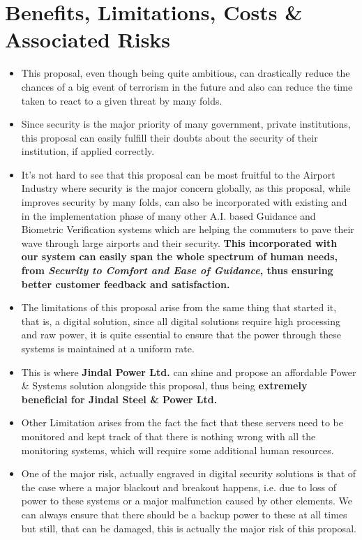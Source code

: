 \documentclass[a4paper,11pt]{article}
\begin{document}
\section{Benefits, Limitations, Costs \& Associated Risks}
\begin{itemize}
\item{This proposal, even though being quite ambitious, can drastically reduce the chances of a big event of terrorism in the future and also can reduce the time taken to react to a given threat by many folds.}
\item{Since security is the major priority of many government, private institutions, this proposal can easily fulfill their doubts about the security of their institution, if applied correctly.}
\item{It's not hard to see that this proposal can be most fruitful to the Airport Industry where security is the major concern globally, as this proposal, while improves security by many folds, can also be incorporated with existing and in the implementation phase of many other A.I. based Guidance and Biometric Verification systems which are helping the commuters to pave their wave through large airports and their security. \textbf{This incorporated with our system can easily span the whole spectrum of human needs, from \textit{Security to Comfort and Ease of Guidance}, thus ensuring better customer feedback and satisfaction.}}
\item{The limitations of this proposal arise from the same thing that started it, that is, a digital solution, since all digital solutions require high processing and raw power, it is quite essential to ensure that the power through these systems is maintained at a uniform rate.}
\item{This is where \textbf{Jindal Power Ltd.} can shine and propose an affordable Power \& Systems solution alongside this proposal, thus being \textbf{extremely beneficial for Jindal Steel \& Power Ltd.}}
\item{Other Limitation arises from the fact the fact that these servers need to be monitored and kept track of that there is nothing wrong with all the monitoring systems, which will require some additional human resources.}
\item{One of the major risk, actually engraved in digital security solutions is that of the case where a major blackout and breakout happens, i.e. due to loss of power to these systems or a major malfunction caused by other elements. We can always ensure that there should be a backup power to these at all times but still, that can be damaged, this is actually the major risk of this proposal.}

\end{itemize}
\end{document}
